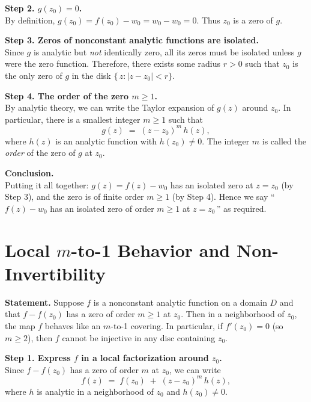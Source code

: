 \documentclass[12pt]{article}
\theoremstyle{definition} %
\theoremstyle{plain} %
\begin{document}
\medskip

\noindent
\textbf{Step 2. $g(z_0) = 0$.}\\
By definition, $g(z_0) = f(z_0) - w_0 = w_0 - w_0 = 0$.  Thus $z_0$ is a zero of $g$.

\medskip

\noindent
\textbf{Step 3. Zeros of nonconstant analytic functions are isolated.}\\
Since $g$ is analytic but \emph{not} identically zero, all its zeros must be isolated unless $g$
were the zero function.  Therefore, there exists some radius $r > 0$ such that $z_0$ is the
only zero of $g$ in the disk $\{\,z : |z - z_0| < r\}$.

\medskip

\noindent
\textbf{Step 4. The order of the zero $m \ge 1$.}\\
By analytic theory, we can write the Taylor expansion of $g(z)$ around $z_0$.  In particular,
there is a smallest integer $m \ge 1$ such that
\[
  g(z) \;=\; (z - z_0)^m \, h(z),
\]
where $h(z)$ is an analytic function with $h(z_0) \neq 0$.  The integer $m$ is called the
\emph{order} of the zero of $g$ at $z_0$.

\medskip

\noindent
\textbf{Conclusion.}\\
Putting it all together: $g(z) = f(z) - w_0$ has an isolated zero at $z = z_0$ (by Step 3), and
the zero is of finite order $m \ge 1$ (by Step 4).  Hence we say
``\,$f(z) - w_0$ has an isolated zero of order $m \ge 1$ at $z = z_0$\,'' as required.

\section*{Local $m$-to-1 Behavior and Non-Invertibility}

\noindent
\textbf{Statement.} 
Suppose $f$ is a nonconstant analytic function on a domain $D$ and that
$f - f(z_0)$ has a zero of order $m \ge 1$ at $z_0$. Then in a neighborhood of $z_0$,
the map $f$ behaves like an $m$-to-1 covering. In particular, if $f'(z_0) = 0$ (so $m \ge 2$),
then $f$ cannot be injective in any disc containing $z_0$.

\bigskip

\noindent
\textbf{Step 1. Express $f$ in a local factorization around $z_0$.}\\
Since $f - f(z_0)$ has a zero of order $m$ at $z_0$, we can write
\[
  f(z) \;=\; f(z_0) \;+\; (z - z_0)^{m}\,h(z),
\]
where $h$ is analytic in a neighborhood of $z_0$ and $h(z_0) \neq 0$.
\end{document}
